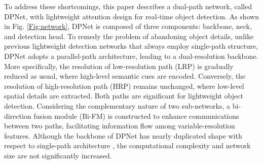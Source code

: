 \documentclass[lettersize,journal]{IEEEtran}
\begin{document}
To address these shortcomings, this paper describes a dual-path network, called DPNet, with lightweight attention design for real-time object detection. As shown in Fig. \ref{Fig:network}, DPNet is composed of three components: backbone, neck, and detection head. To remedy the problem of abandoning object details, unlike previous lightweight detection networks \cite{howard2017mobilenets,sandler2018mobilenetv2,ma2018shufflenet} that always employ single-path structure, DPNet adopts a parallel-path architecture, leading to a dual-resolution backbone. More specifically, the resolution of low-resolution path (LRP) is gradually reduced as usual, where high-level semantic cues are encoded. Conversely, the resolution of high-resolution path (HRP) remains unchanged, where low-level spatial details are extracted. Both paths are significant for lightweight object detection. Considering the complementary nature of two sub-networks, a bi-direction fusion module (Bi-FM) is constructed to enhance communications between two paths, facilitating information flow among variable-resolution features. Although the backbone of DPNet has nearly duplicated shape with respect to single-path architecture \cite{howard2017mobilenets,sandler2018mobilenetv2,ma2018shufflenet}, the computational complexity and network size are not significantly increased.
\end{document}
